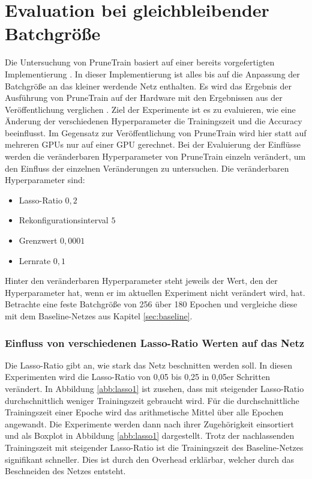 \section{Evaluation bei gleichbleibender Batchgröße}
Die Untersuchung von PruneTrain basiert auf einer bereits vorgefertigten Implementierung \cite{ptImpl}. In dieser Implementierung ist alles bis auf die Anpassung der Batchgröße an das kleiner werdende Netz enthalten. Es wird das Ergebnis der Ausführung von PruneTrain auf der Hardware mit den Ergebnissen aus der Veröffentlichung verglichen \cite{prunetrain}. Ziel der Experimente ist es zu evaluieren, wie eine Änderung der verschiedenen Hyperparameter die Trainingszeit und die Accuracy beeinflusst. Im Gegensatz zur Veröffentlichung von PruneTrain wird hier statt auf mehreren GPUs nur auf einer GPU gerechnet. Bei der Evaluierung der Einflüsse werden die veränderbaren Hyperparameter von PruneTrain einzeln verändert, um den Einfluss der einzelnen Veränderungen zu untersuchen.  
Die veränderbaren Hyperparameter sind:
\begin{itemize}
 \item Lasso-Ratio $0,2$
 \item Rekonfigurationsinterval $5$
 \item Grenzwert $0,0001$
 \item Lernrate $0,1$
\end{itemize}
Hinter den veränderbaren Hyperparameter steht jeweils der Wert, den der Hyperparameter hat, wenn er im aktuellen Experiment nicht verändert wird, hat.
Betrachte eine feste Batchgröße von 256 über 180 Epochen und vergleiche diese mit dem Baseline-Netzes aus Kapitel \ref{sec:baseline}. 


\subsubsection{Einfluss von verschiedenen Lasso-Ratio Werten auf das Netz}
Die Lasso-Ratio gibt an, wie stark das Netz beschnitten werden soll. In diesen Experimenten wird die Lasso-Ratio von 0,05 bis 0,25 in 0,05er Schritten verändert. In Abbildung \ref{abb:lasso1} ist zusehen, dass mit steigender Lasso-Ratio durchschnittlich weniger Trainingszeit gebraucht wird. Für die durchschnittliche Trainingszeit einer Epoche wird das arithmetische Mittel über alle Epochen angewandt. Die Experimente werden dann nach ihrer Zugehörigkeit einsortiert und als Boxplot in Abbildung \ref{abb:lasso1} dargestellt. Trotz der nachlassenden Trainingszeit mit steigender Lasso-Ratio ist die Trainingszeit des Baseline-Netzes signifikant schneller. Dies ist durch den Overhead erklärbar, welcher durch das Beschneiden des Netzes entsteht.


